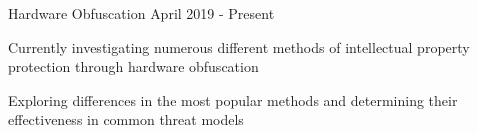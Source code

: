 
\begin{cventries}
	\cvproject
		{Hardware Obfuscation}
		{April 2019 - Present}
		{
			\begin{cvitems}
			\item Currently investigating numerous different methods of intellectual property protection through hardware obfuscation
			\item Exploring differences in the most popular methods and determining their effectiveness in common threat models
			\end{cvitems}
		}
\end{cventries}

